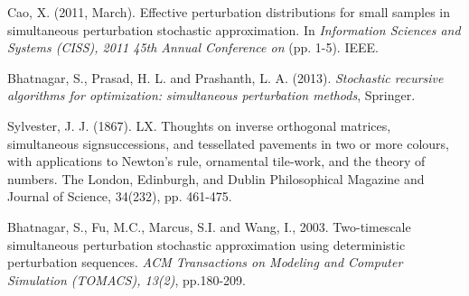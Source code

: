 \documentclass[conference,10.6cpt]{IEEEtran}
\begin{document}
\begin{thebibliography}{1}
Cao, X. (2011, March). Effective perturbation distributions for small samples in simultaneous perturbation stochastic approximation. In \textit{Information Sciences and Systems (CISS), 2011 45th Annual Conference on} (pp. 1-5). IEEE.


 Bhatnagar, S., Prasad,
  H. L. and Prashanth, L. A. (2013). \textit{Stochastic recursive
    algorithms for optimization: simultaneous perturbation methods},
  Springer.

 Sylvester,
  J. J. (1867). LX. Thoughts on inverse orthogonal matrices,
  simultaneous signsuccessions, and tessellated pavements in two or more
  colours, with applications to Newton's rule, ornamental tile-work, and
  the theory of numbers. The London, Edinburgh, and Dublin Philosophical
  Magazine and Journal of Science, 34(232), pp. 461-475.

Bhatnagar, S., Fu, M.C., Marcus, S.I. and Wang, I., 2003. Two-timescale simultaneous perturbation stochastic approximation using deterministic perturbation sequences. \textit{ACM Transactions on Modeling and Computer Simulation (TOMACS), 13(2)}, pp.180-209.

\end{thebibliography}
\end{document}
